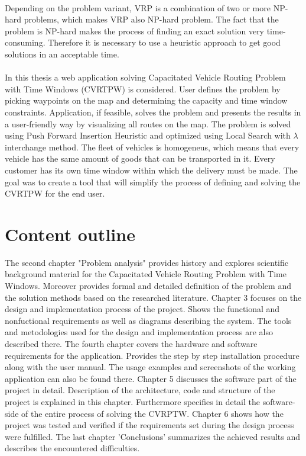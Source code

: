 \documentclass[a4paper,twoside,12pt]{book}
\begin{document}
\paragraph{}
Depending on the problem variant, VRP is a combination of two or more NP-hard problems, which makes VRP also NP-hard problem. The fact that the problem is NP-hard makes the process of finding an exact solution very time-consuming. Therefore it is necessary to use a heuristic approach to get good solutions in an acceptable time.
\paragraph{}
In this thesis a web application solving Capacitated Vehicle Routing Problem with Time Windows (CVRTPW) is considered. User defines the problem by picking waypoints on the map and determining the capacity and time window constraints. Application, if feasible, solves the problem and presents the results in a user-friendly way by visualizing all routes on the map.
The problem is solved using Push Forward Insertion Heuristic and optimized using Local Search with {$\lambda$} interchange method. 
The fleet of vehicles is homogeneus, which means that every vehicle has the same amount of goods that can be transported in it. Every customer has its own time window within which the delivery must be made.
The goal was to create a tool that will simplify the process of defining and solving the CVRTPW for the end user.


\section{Content outline}
 The second chapter "Problem analysis" provides history and explores scientific background material for the Capacitated Vehicle Routing Problem with Time Windows. Moreover provides formal and detailed definition of the problem and the solution methods based on the researched literature. Chapter 3 focuses on the design and implementation process of the project. Shows the functional and nonfuctional requirements as well as diagrams describing the system. The tools and metodologies used for the design and implementation process are also described there. The fourth chapter covers the hardware and software requirements for the application. Provides the step by step installation procedure along with the user manual. The usage examples and screenshots of the working application can also be found there. Chapter 5 discusses the software part of the project in detail. Description of the architecture, code and structure of the project is explained in this chapter. Furthermore specifies in detail the software-side of the entire process of solving the CVRPTW. Chapter 6 shows how the project was tested and verified if the requirements set during the design process were fulfilled. The last chapter 'Conclusions' summarizes the achieved results and describes the encountered difficulties.
\end{document}
